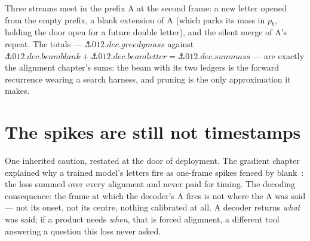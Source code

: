 \begin{narrative}
\begin{center}
\end{center}

Three streams meet in the prefix A at the second frame: a new letter
opened from the empty prefix, a blank extension of A (which parks its
mass in $p_b$, holding the door open for a future double letter), and
the silent merge of A's repeat. The totals —
$\anchor{012.dec.greedymass}$ against $\anchor{012.dec.beamblank} +
\anchor{012.dec.beamletter} = \anchor{012.dec.summass}$ — are exactly
the alignment chapter's sums: the beam with its two ledgers is the
forward recurrence wearing a search harness, and pruning is the only
approximation it makes.

\section{The spikes are still not timestamps}

One inherited caution, restated at the door of deployment. The
gradient chapter explained why a trained model's letters fire as
one-frame spikes fenced by blank~\cite{deep_learning-zeyer-et-al-2021-why-does-ctc-result-in-peaky-behavior}:
the loss summed over every alignment and never paid for timing. The
decoding consequence: the frame at which the decoder's A fires is not
where the A was said — not its onset, not its centre, nothing
calibrated at all. A decoder returns \emph{what} was said; if a
product needs \emph{when}, that is forced alignment, a different tool
answering a question this loss never asked.


\end{narrative}
